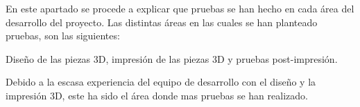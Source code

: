 En este apartado se procede a explicar que pruebas se han hecho en cada área del desarrollo del proyecto. Las distintas áreas en las cuales se han planteado pruebas, son las siguientes:

Diseño de las piezas 3D, impresión de las piezas 3D y pruebas post-impresión.

Debido a la escasa experiencia del equipo de desarrollo con el diseño y la impresión 3D, este ha sido el área donde mas pruebas se han realizado. 


